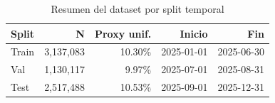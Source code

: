 \begin{table}[htbp]
\centering
\small
\caption{Resumen del dataset por split temporal}
\label{tab:dataset-summary}
\begin{tabular}{lrrrr}
\toprule
Split & N & Proxy unif. & Inicio & Fin \\
\midrule
  Train & 3,137,083 & 10.30\% & 2025-01-01 & 2025-06-30 \\
  Val & 1,130,117 & 9.97\% & 2025-07-01 & 2025-08-31 \\
  Test & 2,517,488 & 10.53\% & 2025-09-01 & 2025-12-31 \\
\bottomrule
\end{tabular}
\end{table}
